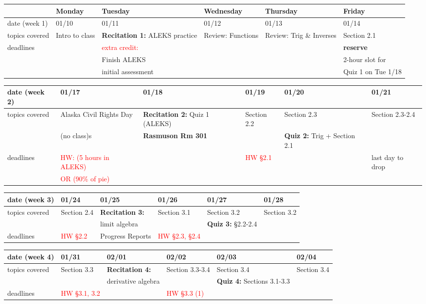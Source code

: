 \documentclass[11pt,fleqn]{article}
\begin{document}
\begin{tabularx}{\textwidth}{|X|| X | X | X | X | X |}
\hline
&Monday & Tuesday & Wednesday & Thursday & Friday \\
\hline \hline
\rowcolor{gray!20} 
date (week 1)&01/10&01/11&01/12&01/13&01/14\\
\hline
topics covered&Intro to class& \textbf{Recitation 1:} ALEKS practice&  Review: Functions & Review:  Trig \& Inverses&Section 2.1\\
\hline
deadlines&&\textcolor{red}{extra credit:} &&&\textbf{reserve}\\
&&Finish ALEKS&&&2-hour slot for\\
&& initial assessment &&& Quiz 1 on Tue 1/18\\
\hline 
\end{tabularx}
\vfill
\begin{tabularx}{\textwidth}{|X|| X | X | X | X | X |}
\hline
\rowcolor{gray!20}
date (week 2)&01/17&01/18&01/19&01/20&01/21\\ \hline
topics covered &Alaska Civil Rights Day&\textbf{Recitation 2:} Quiz 1 (ALEKS)& Section 2.2 &Section 2.3&Section 2.3-2.4\\ 
&(no class)s&\textbf{\textcolor{ddgreen}{Rasmuson Rm 301}}&&\textbf{Quiz 2:} Trig + Section 2.1&\\ \hline
deadlines&\textcolor{red}{HW: (5 hours in ALEKS)}&&\textcolor{red}{HW \S 2.1}&&\textcolor{ddgreen}{last day to drop}\\ 
& \textcolor{red}{ OR (90\% of pie)}&&&& \\
 \hline 
 \end{tabularx}
 \vfill
\begin{tabularx}{\textwidth}{|X|| X | X | X | X | X |}
\hline
\rowcolor{gray!20}
date (week 3)&01/24&01/25&01/26&01/27&01/28\\ \hline
topics covered&Section 2.4&\textbf{Recitation 3:} &Section 3.1 &Section 3.2&Section 3.2\\
&&limit algebra&&\textbf{Quiz 3:} \S 2.2-2.4&\\ \hline
deadlines& \textcolor{red}{HW \S 2.2}& \textcolor{ddgreen}{Progress Reports}&\textcolor{red}{HW \S 2.3, \S 2.4}&& \\ \hline
\end{tabularx}
\vfill
\begin{tabularx}{\textwidth}{|X|| X | X | X | X | X |}
\hline
\rowcolor{gray!20}
date (week 4)&01/31&02/01&02/02&02/03&02/04\\ \hline
topics covered&Section 3.3&\textbf{Recitation 4:}&Section 3.3-3.4&Section 3.4&Section 3.4\\ 
&&derivative algebra&&\textbf{Quiz 4:} Sections 3.1-3.3& \\ \hline
deadlines&\textcolor{red}{HW \S 3.1, 3.2}& &\textcolor{red}{HW \S 3.3 (1)}&& \\ \hline 
\end{tabularx}
\end{document}
